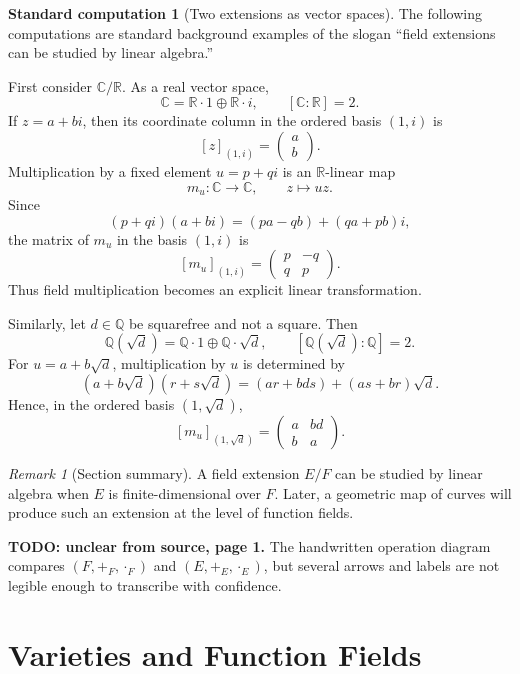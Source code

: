 \documentclass[11pt]{article}
\theoremstyle{definition}
\newtheorem{calculation}[theorem]{Standard computation}
\theoremstyle{remark}
\newtheorem{remark}[theorem]{Remark}
\newcommand{\C}{\mathbb{C}}
\newcommand{\Q}{\mathbb{Q}}
\newcommand{\sourceunclear}[2]{%
  \par\smallskip
  \noindent\textbf{TODO: unclear from source, page #1.} #2
  \par\smallskip
}
\begin{document}
\begin{calculation}[Two extensions as vector spaces]
The following computations are standard background examples of the slogan
``field extensions can be studied by linear algebra.''

First consider \(\C/\mathbb{R}\).  As a real vector space,
\[
  \C=\mathbb{R}\cdot 1\oplus \mathbb{R}\cdot i,
  \qquad [\C:\mathbb{R}]=2.
\]
If \(z=a+bi\), then its coordinate column in the ordered basis \((1,i)\) is
\[
  [z]_{(1,i)}=\begin{pmatrix}a\\ b\end{pmatrix}.
\]
Multiplication by a fixed element \(u=p+qi\) is an \(\mathbb{R}\)-linear map
\[
  m_u\colon \C\longrightarrow \C,\qquad z\longmapsto uz.
\]
Since
\[
  (p+qi)(a+bi)=(pa-qb)+(qa+pb)i,
\]
the matrix of \(m_u\) in the basis \((1,i)\) is
\[
  [m_u]_{(1,i)}
  =
  \begin{pmatrix}
    p & -q\\
    q & p
  \end{pmatrix}.
\]
Thus field multiplication becomes an explicit linear transformation.

Similarly, let \(d\in\Q\) be squarefree and not a square.  Then
\[
  \Q(\sqrt d)=\Q\cdot 1\oplus \Q\cdot \sqrt d,
  \qquad [\Q(\sqrt d):\Q]=2.
\]
For \(u=a+b\sqrt d\), multiplication by \(u\) is determined by
\[
  (a+b\sqrt d)(r+s\sqrt d)=(ar+bds)+(as+br)\sqrt d.
\]
Hence, in the ordered basis \((1,\sqrt d)\),
\[
  [m_u]_{(1,\sqrt d)}
  =
  \begin{pmatrix}
    a & bd\\
    b & a
  \end{pmatrix}.
\]
\end{calculation}

\begin{remark}[Section summary]
A field extension \(E/F\) can be studied by linear algebra when \(E\) is
finite-dimensional over \(F\).  Later, a geometric map of curves will produce
such an extension at the level of function fields.
\end{remark}

\sourceunclear{1}{The handwritten operation diagram compares
\((F,+_F,\cdot_F)\) and \((E,+_E,\cdot_E)\), but several arrows and labels are
not legible enough to transcribe with confidence.}

\section{Varieties and Function Fields}
\end{document}
